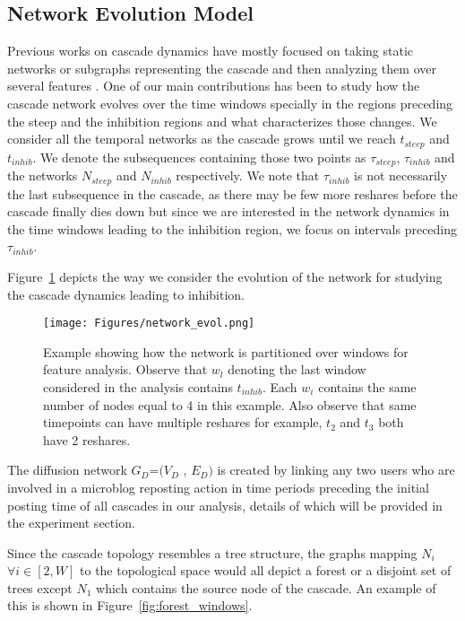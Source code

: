 \documentclass[smallextended]{svjour3}       %
\theoremstyle{definition}
\begin{document}
\subsection{Network Evolution Model}
\label{sec:net_evol}
Previous works on cascade dynamics have mostly focused on taking static networks or subgraphs representing the cascade and then analyzing them over several features \cite{mislove_sna}. One of our main contributions has been to study how the cascade network evolves over the time windows specially in the regions preceding the steep and the inhibition regions and what characterizes those changes. We consider all the temporal networks as the cascade grows until we reach $t_{steep}$ and $t_{inhib}$. We denote the subsequences containing those two points as $\tau_{steep}$, $\tau_{inhib}$ and the networks $N_{steep}$ and $N_{inhib}$ respectively. We note that $\tau_{inhib}$ is not necessarily the last subsequence in the cascade, as there may be few more reshares before the cascade finally dies down but since we are interested in the network dynamics in the time windows leading to the inhibition region, we focus on intervals preceding $\tau_{inhib}$. 

Figure~\ref{fig:net_evolve} depicts the way we consider the evolution of the network for studying the cascade dynamics leading to inhibition.  

\begin{figure}[t!]
	\centering
	\texttt{[image: Figures/network\_evol.png]}
	\caption{Example showing how the network is partitioned over windows for feature analysis. Observe that $w_l$ denoting the last window considered in the analysis contains $t_{inhib}$. Each $w_i$ contains the same number of nodes equal to 4 in this example. Also observe that same timepoints can have multiple reshares for example, $t_2 $ and $t_3 $ both have 2 reshares. }
	\label{fig:net_evolve}
\end{figure}


The diffusion network $G_D$=$(V_D$ , $E_D)$ is created by linking any two users who are involved in a microblog reposting action in time periods preceding the initial posting time of all cascades in our analysis, details of which will be provided in the experiment section. 

Since the cascade topology resembles a tree structure, the graphs mapping $N_i$ $\forall i \in [2, W] $ to the topological space would all depict a forest or a disjoint set of trees except $N_1 $ which contains the source node of the cascade. An example of this is shown in Figure~\ref{fig:forest_windows}.
\end{document}
